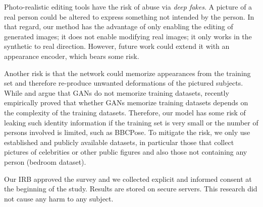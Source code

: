 \documentclass[10pt, conference, compsocconf]{IEEEtran}
\begin{document}
Photo-realistic editing tools have the risk of abuse via \emph{deep fakes}. A picture of a real person could be altered to express something not intended by the person. In that regard, our method has the advantage of only enabling the editing of generated images; it does not enable modifying real images; it only works in the synthetic to real direction. However, future work could extend it with an appearance encoder, which bears some risk.

Another risk is that the network could memorize appearances from the training set and therefore re-produce unwanted deformations of the pictured subjects.
While \cite{brock2018large} and \cite{karras2018progressive} argue that GANs do not memorize training datasets, recently \cite{Feng_2021_ICCV} empirically proved that whether GANs memorize training datasets depends on the complexity of the training datasets. Therefore, our model has some risk of leaking such identity information if the training set is very small or the number of persons involved is limited, such as BBCPose.
To mitigate the risk, we only use established and publicly available datasets, in particular those that collect pictures of celebrities or other public figures and also those not containing any person (bedroom dataset).

Our IRB approved the survey and we collected explicit and informed consent at the beginning of the study. Results are stored on secure servers. This research did not cause any harm to any subject. 



%
 
\end{document}
